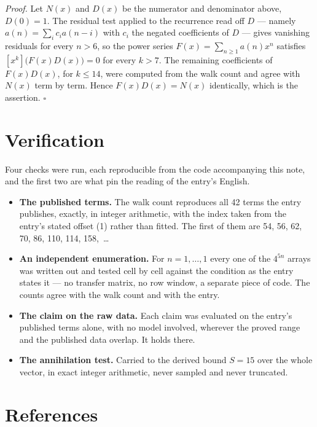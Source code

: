 \documentclass[11pt]{article}
\theoremstyle{definition}
\begin{document}
{\itshape Proof.} Let $N(x)$ and $D(x)$ be the numerator and denominator above, $D(0)=1$. The residual test applied to the recurrence read off $D$ --- namely $a(n) = \sum_i c_i a(n-i)$ with $c_i$ the negated coefficients of $D$ --- gives vanishing residuals for every $n > 6$, so the power series $F(x)=\sum_{n\ge 1}a(n)x^n$ satisfies $[x^k]\bigl(F(x)D(x)\bigr) = 0$ for every $k > 7$. The remaining coefficients of $F(x)D(x)$, for $k \le 14$, were computed from the walk count and agree with $N(x)$ term by term. Hence $F(x)D(x) = N(x)$ identically, which is the assertion. $\square$

\section{Verification}

Four checks were run, each reproducible from the code accompanying this note, and the first two are what pin the reading of the entry's English.

\begin{itemize}

\item {\bfseries The published terms.} The walk count reproduces all 42 terms the entry publishes, exactly, in integer arithmetic, with the index taken from the entry's stated offset (1) rather than fitted. The first of them are 54, 56, 62, 70, 86, 110, 114, 158,~\dots

\item {\bfseries An independent enumeration.} For $n = 1,\dots,1$ every one of the $4^{5n}$ arrays was written out and tested cell by cell against the condition as the entry states it --- no transfer matrix, no row window, a separate piece of code. The counts agree with the walk count and with the entry.

\item {\bfseries The claim on the raw data.} Each claim was evaluated on the entry's published terms alone, with no model involved, wherever the proved range and the published data overlap. It holds there.

\item {\bfseries The annihilation test.} Carried to the derived bound $S = 15$ over the whole vector, in exact integer arithmetic, never sampled and never truncated.

\end{itemize}

\section{References}
\end{document}
